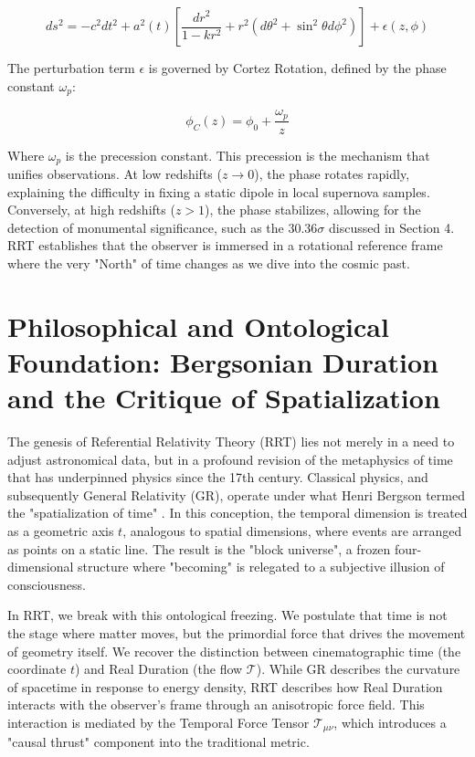 \documentclass[12pt, a4paper]{article}
\begin{document}
\begin{equation}
ds^2 = -c^2 dt^2 + a^2(t) \left[ \frac{dr^2}{1-kr^2} + r^2(d\theta^2 + \sin^2\theta d\phi^2) \right] + \epsilon(z, \phi)
\end{equation}

The perturbation term $\epsilon$ is governed by Cortez Rotation, defined by the phase constant $\omega_p$:

\begin{equation}
\phi_{C}(z) = \phi_0 + \frac{\omega_p}{z}
\end{equation}

Where $\omega_p$ is the precession constant. This precession is the mechanism that unifies observations. At low redshifts ($z \rightarrow 0$), the phase rotates rapidly, explaining the difficulty in fixing a static dipole in local supernova samples. Conversely, at high redshifts ($z > 1$), the phase stabilizes, allowing for the detection of monumental significance, such as the $30.36\sigma$ discussed in Section 4. RRT establishes that the observer is immersed in a rotational reference frame where the very "North" of time changes as we dive into the cosmic past.

\section{Philosophical and Ontological Foundation: Bergsonian Duration and the Critique of Spatialization}

The genesis of Referential Relativity Theory (RRT) lies not merely in a need to adjust astronomical data, but in a profound revision of the metaphysics of time that has underpinned physics since the 17th century. Classical physics, and subsequently General Relativity (GR), operate under what Henri Bergson termed the "spatialization of time" \cite{Bergson1889}. In this conception, the temporal dimension is treated as a geometric axis $t$, analogous to spatial dimensions, where events are arranged as points on a static line. The result is the "block universe", a frozen four-dimensional structure where "becoming" is relegated to a subjective illusion of consciousness.

In RRT, we break with this ontological freezing. We postulate that time is not the stage where matter moves, but the primordial force that drives the movement of geometry itself. We recover the distinction between cinematographic time (the coordinate $t$) and Real Duration (the flow $\mathcal{T}$). While GR describes the curvature of spacetime in response to energy density, RRT describes how Real Duration interacts with the observer's frame through an anisotropic force field. This interaction is mediated by the Temporal Force Tensor $\mathcal{T}_{\mu\nu}$, which introduces a "causal thrust" component into the traditional metric.
\end{document}
